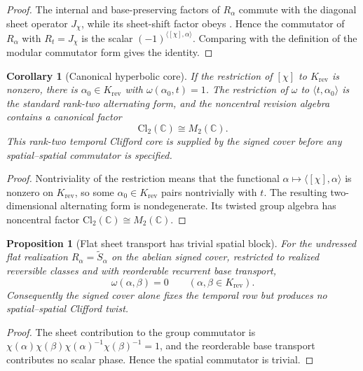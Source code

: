 \documentclass[11pt]{article}
\newtheorem{proposition}[theorem]{Proposition}
\newtheorem{corollary}[theorem]{Corollary}
\theoremstyle{definition}
\theoremstyle{remark}
\newcommand{\C}{\mathbb{C}}
\newcommand{\Cl}{\mathrm{Cl}}
\begin{document}
\begin{proof}
The internal and base-preserving factors of $R_\alpha$ commute with the diagonal
sheet operator $J_\chi$, while its sheet-shift factor obeys
.  Hence the commutator of $R_\alpha$ with
$R_t=J_\chi$ is the scalar
$(-1)^{\langle[\chi],\alpha\rangle}$.  Comparing with the definition of the
modular commutator form gives the identity.
\end{proof}

\begin{corollary}[Canonical hyperbolic core]
\label{cor:canonical-hyperbolic-core}
If the restriction of \([\chi]\) to \(K_{\mathrm{rev}}\) is nonzero, there is
\(\alpha_0\in K_{\mathrm{rev}}\) with \(\omega(\alpha_0,t)=1\).  The restriction
of \(\omega\) to \(\langle t,\alpha_0\rangle\) is the standard rank-two
alternating form, and the
noncentral revision algebra contains a canonical factor
\[
 \Cl_2(\C)\cong M_2(\C).
\]
This rank-two temporal Clifford core is supplied by the signed cover before any
spatial--spatial commutator is specified.
\end{corollary}

\begin{proof}
Nontriviality of the restriction means that the functional
\(\alpha\mapsto\langle[\chi],\alpha\rangle\) is nonzero on
\(K_{\mathrm{rev}}\), so some \(\alpha_0\in K_{\mathrm{rev}}\) pairs
nontrivially with \(t\).  The resulting two-dimensional alternating form is
nondegenerate.  Its twisted group algebra has noncentral factor
$\Cl_2(\C)\cong M_2(\C)$.
\end{proof}

\begin{proposition}[Flat sheet transport has trivial spatial block]
\label{prop:flat-spatial-block-zero}
For the undressed flat realization \(R_\alpha=\widetilde S_\alpha\) on the
abelian signed cover, restricted to realized reversible classes and with
reorderable recurrent base transport,
\[
 \omega(\alpha,\beta)=0
 \qquad(\alpha,\beta\in K_{\mathrm{rev}}).
\]
Consequently the signed cover alone fixes the temporal row but produces no
spatial--spatial Clifford twist.
\end{proposition}

\begin{proof}
The sheet contribution to the group commutator is
$\chi(\alpha)\chi(\beta)\chi(\alpha)^{-1}\chi(\beta)^{-1}=1$, and the
reorderable base transport contributes no scalar phase.  Hence the spatial
commutator is trivial.
\end{proof}
\end{document}
